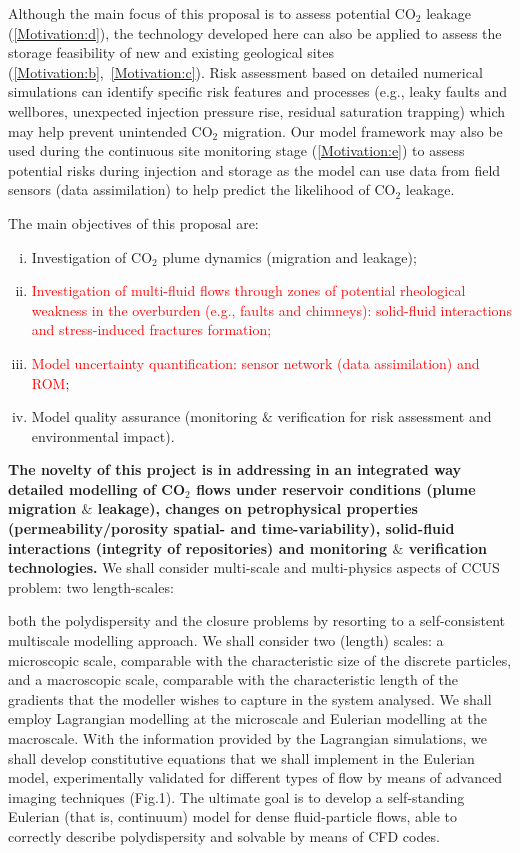 \documentclass[12pts,a4paper,amsmath,amssymb,floatfix]{article}%
\newcommand{\red}{\textcolor{red}}
\newcommand{\CO}{CO\ensuremath{_{2}}}
\begin{document}
Although the main focus of this proposal is to assess potential \CO\; leakage (\ref{Motivation:d}), the technology developed here can also be applied to assess the storage feasibility of new and existing geological sites (\ref{Motivation:b},~\ref{Motivation:c}).  Risk assessment based on detailed numerical simulations can identify specific risk features and processes (e.g., leaky faults and wellbores, unexpected injection pressure rise, residual saturation trapping) which may help prevent unintended \CO\; migration. Our model framework may also be used during the continuous site monitoring stage (\ref{Motivation:e}) to assess potential risks during injection and storage as the model can use data from field sensors (data assimilation) to help predict the likelihood of \CO\; leakage.

The main objectives of this proposal are:
\begin{enumerate}[(i)]
%
   \item Investigation of \CO\; plume dynamics (migration and leakage);
%
   \item \red{Investigation of multi-fluid flows through zones of potential rheological weakness in the overburden (e.g., faults and chimneys): solid-fluid interactions and stress-induced fractures formation;}
%
   \item \red{Model uncertainty quantification: sensor network (data assimilation) and ROM};
%
   \item Model quality assurance (monitoring $\&$ verification for risk assessment and environmental impact).
%
\end{enumerate}

{\bf The novelty of this project is in addressing in an integrated way detailed modelling of \CO\; flows under reservoir conditions (plume migration $\&$ leakage), changes on petrophysical properties (permeability/porosity spatial- and time-variability), solid-fluid interactions (integrity of repositories) and monitoring $\&$ verification technologies.} We shall consider multi-scale and multi-physics aspects of CCUS problem: two length-scales: 


both the polydispersity and the closure problems by resorting to a self-consistent multiscale modelling approach. We shall consider two (length) scales: a microscopic scale, comparable with the characteristic size of the discrete particles, and a macroscopic scale, comparable with the characteristic length of the gradients that the modeller wishes to capture in the system analysed. We shall employ Lagrangian modelling at the microscale and Eulerian modelling at the macroscale. With the information provided by the Lagrangian simulations, we shall develop constitutive equations that we shall implement in the Eulerian model, experimentally validated for different types of flow by means of advanced imaging techniques (Fig.1). The ultimate goal is to develop a self-standing Eulerian (that is, continuum) model for dense fluid-particle flows, able to correctly describe polydispersity and solvable by means of CFD codes.
\end{document}
